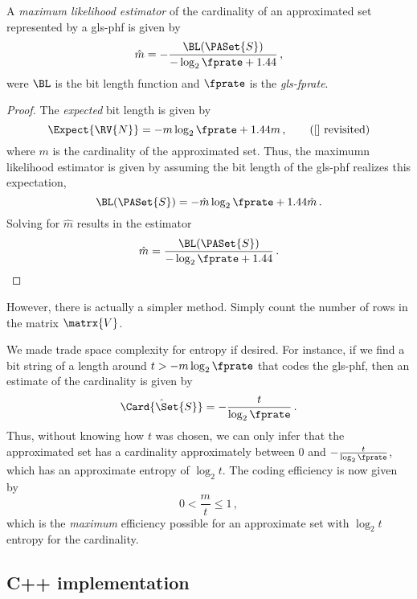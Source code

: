 \begin{theorem}
A \emph{maximum likelihood estimator} of the cardinality of an approximated set represented by a \gls{gls-phf} is given by
\begin{equation}
    \hat{m} = -\frac{\BL\!\left(\PASet{S}\right)}{-\log_2 \fprate + 1.44}\,,
\end{equation}
were $\BL$ is the bit length function and $\fprate$ is the \emph{\gls{gls-fprate}}.
\end{theorem}
\begin{proof}
The \emph{expected} bit length is given by
\begin{equation*}
    \Expect{\RV{N}} = -m \log_2 \fprate + 1.44 m\,, 
    \tag{\ref{} revisited}
\end{equation*}
where $m$ is the cardinality of the approximated set. Thus, the maximumn likelihood estimator is given by assuming the bit length of the \gls{gls-phf} realizes this expectation,
\begin{equation}
    \BL(\PASet{S}) = -\hat{m} \log_2 \fprate + 1.44 \hat{m}\,.
\end{equation}
Solving for $\hat{m}$ results in the estimator
\begin{equation}
    \hat{m} = \frac{\BL(\PASet{S})}{-\log_2 \fprate + 1.44}\,.
\end{equation}
\end{proof}
However, there is actually a simpler method. Simply count the number of rows in the matrix $\matrx{V}$.

We made trade space complexity for entropy if desired. For instance, if we find a bit string of a length around $t > -m \log_2 \fprate$ that codes the \gls{gls-phf}, then an estimate of the cardinality is given by
\begin{equation}
    \hat{\Card{\Set{S}}} = -\frac{t}{\log_2 \fprate}\,.
\end{equation}
Thus, without knowing how $t$ was chosen, we can only infer that the approximated set has a cardinality approximately between $0$ and $-\frac{t}{\log_2 \fprate}$, which has an approximate entropy of $\log_2 t$. The coding efficiency is now given by
\begin{equation}
    0 < \frac{m}{t} \leq 1\,,
\end{equation}
which is the \emph{maximum} efficiency possible for an approximate set with $\log_2 t$ entropy for the cardinality.

\subsection{C++ implementation}
%

